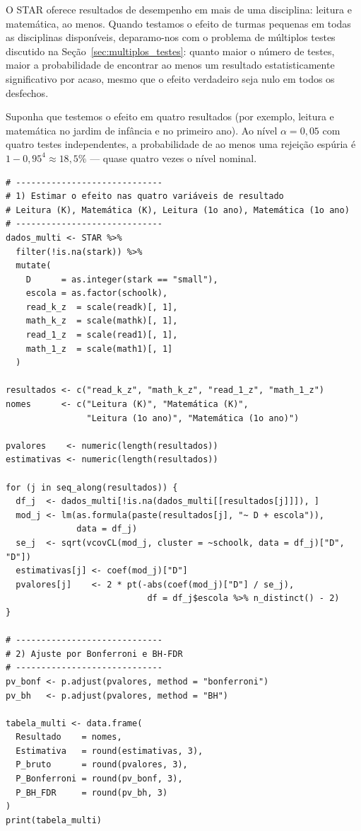O STAR oferece resultados de desempenho em mais de uma disciplina: leitura e matemática, ao menos. Quando testamos o efeito de turmas pequenas em todas as disciplinas disponíveis, deparamo-nos com o problema de múltiplos testes discutido na Seção~\ref{sec:multiplos_testes}: quanto maior o número de testes, maior a probabilidade de encontrar ao menos um resultado estatisticamente significativo por acaso, mesmo que o efeito verdadeiro seja nulo em todos os desfechos.

Suponha que testemos o efeito em quatro resultados (por exemplo, leitura e matemática no jardim de infância e no primeiro ano). Ao nível $\alpha = 0{,}05$ com quatro testes independentes, a probabilidade de ao menos uma rejeição espúria é $1 - 0{,}95^4 \approx 18{,}5\%$ --- quase quatro vezes o nível nominal.

\begin{lstlisting}[style=Rstyle, caption={Múltiplos testes: quatro resultados com correção de Bonferroni e BH-FDR}]
# -----------------------------
# 1) Estimar o efeito nas quatro variáveis de resultado
# Leitura (K), Matemática (K), Leitura (1o ano), Matemática (1o ano)
# -----------------------------
dados_multi <- STAR %>%
  filter(!is.na(stark)) %>%
  mutate(
    D      = as.integer(stark == "small"),
    escola = as.factor(schoolk),
    read_k_z  = scale(readk)[, 1],
    math_k_z  = scale(mathk)[, 1],
    read_1_z  = scale(read1)[, 1],
    math_1_z  = scale(math1)[, 1]
  )

resultados <- c("read_k_z", "math_k_z", "read_1_z", "math_1_z")
nomes      <- c("Leitura (K)", "Matemática (K)",
                "Leitura (1o ano)", "Matemática (1o ano)")

pvalores    <- numeric(length(resultados))
estimativas <- numeric(length(resultados))

for (j in seq_along(resultados)) {
  df_j  <- dados_multi[!is.na(dados_multi[[resultados[j]]]), ]
  mod_j <- lm(as.formula(paste(resultados[j], "~ D + escola")),
              data = df_j)
  se_j  <- sqrt(vcovCL(mod_j, cluster = ~schoolk, data = df_j)["D", "D"])
  estimativas[j] <- coef(mod_j)["D"]
  pvalores[j]    <- 2 * pt(-abs(coef(mod_j)["D"] / se_j),
                            df = df_j$escola %>% n_distinct() - 2)
}

# -----------------------------
# 2) Ajuste por Bonferroni e BH-FDR
# -----------------------------
pv_bonf <- p.adjust(pvalores, method = "bonferroni")
pv_bh   <- p.adjust(pvalores, method = "BH")

tabela_multi <- data.frame(
  Resultado    = nomes,
  Estimativa   = round(estimativas, 3),
  P_bruto      = round(pvalores, 3),
  P_Bonferroni = round(pv_bonf, 3),
  P_BH_FDR     = round(pv_bh, 3)
)
print(tabela_multi)
\end{lstlisting}

